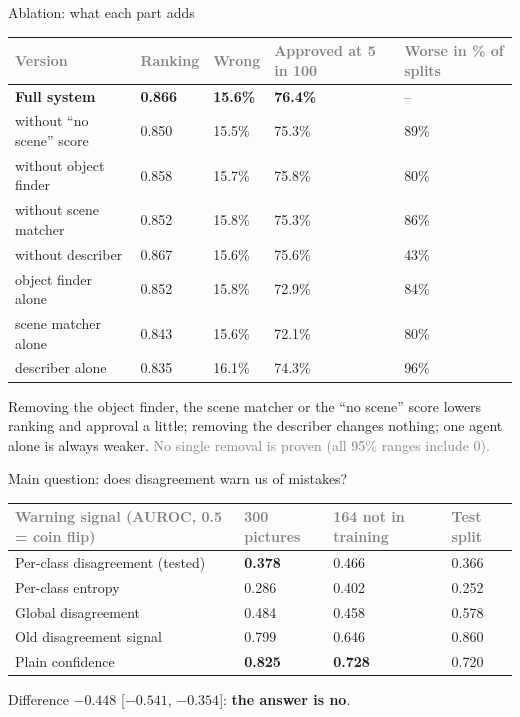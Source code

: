 \documentclass[aspectratio=169,11pt]{beamer}
\renewcommand{\arraystretch}{1.3}
\newcommand{\yes}[1]{\textcolor{accent}{\textbf{#1}}}
\newcommand{\no}[1]{\textcolor{warn}{\textbf{#1}}}
\newcommand{\h}[1]{\textcolor{grey}{#1}}
\newcommand{\remark}[1]{\par\vspace{0.35cm}{\small\textcolor{grey}{#1}}}
\begin{document}
\begin{frame}{Ablation: what each part adds}
\footnotesize\renewcommand{\arraystretch}{1.12}
\begin{tabular}{@{}L{3.9cm} C{1.8cm} C{1.6cm} C{2.4cm} C{2.4cm}@{}}
\toprule
\h{Version} & \h{Ranking} & \h{Wrong} & \h{Approved at 5 in 100} & \h{Worse in \% of splits}\\
\midrule
\textbf{Full system} & \textbf{0.866} & \textbf{15.6\%} & \textbf{76.4\%} & --\\
\midrule
without ``no scene'' score & 0.850 & 15.5\% & 75.3\% & 89\%\\
without object finder & 0.858 & 15.7\% & 75.8\% & 80\%\\
without scene matcher & 0.852 & 15.8\% & 75.3\% & 86\%\\
without describer & 0.867 & 15.6\% & 75.6\% & 43\%\\
\midrule
object finder alone & 0.852 & 15.8\% & 72.9\% & 84\%\\
scene matcher alone & 0.843 & 15.6\% & 72.1\% & 80\%\\
describer alone & 0.835 & 16.1\% & 74.3\% & 96\%\\
\bottomrule
\end{tabular}

\vspace{0.25cm}
\small
Removing the object finder, the scene matcher or the ``no scene'' score lowers ranking and approval a little; removing the describer changes nothing; one agent alone is always weaker. \textcolor{grey}{No single removal is proven (all 95\% ranges include 0).}
\end{frame}

\begin{frame}{Main question: does disagreement warn us of mistakes?}
\small
\begin{tabular}{@{}L{5.4cm} C{2.2cm} C{2.6cm} C{2.2cm}@{}}
\toprule
\h{Warning signal (AUROC, 0.5 = coin flip)} & \h{300 pictures} & \h{164 not in training} & \h{Test split}\\
\midrule
Per-class disagreement (tested) & \no{0.378} & 0.466 & 0.366\\
Per-class entropy & 0.286 & 0.402 & 0.252\\
Global disagreement & 0.484 & 0.458 & 0.578\\
Old disagreement signal & 0.799 & 0.646 & 0.860\\
Plain confidence & \yes{0.825} & \yes{0.728} & 0.720\\
\bottomrule
\end{tabular}

\vspace{0.3cm}
\normalsize
Difference $-0.448$ [$-0.541$, $-0.354$]: \textbf{the answer is no}.
\remark{Why: 65 of the 72 mistakes are missed scenes on pictures with few objects (0.9 classes against 1.5). There the systems' per-class scores agree most, so the mistakes sit where agreement is highest.}
\end{frame}
\end{document}
